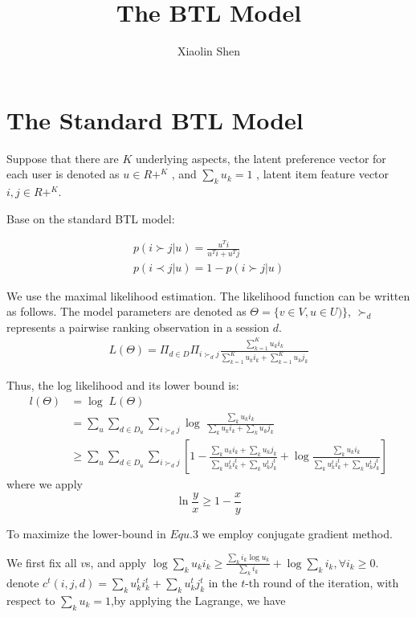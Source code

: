 \documentclass{article}
\title{The BTL Model}
\author{Xiaolin Shen}
\begin{document}
\maketitle


\section{The Standard BTL Model}

Suppose that there are $K$ underlying aspects, the latent preference vector for each user is denoted as $ u \in  R+ ^K$ , and $\sum_k u_k = 1$ , latent item feature vector $ i, j \in R + ^K$.

Base on the standard BTL model:

\begin{align*}
	p(i \succ j |u)=\frac{u^{T}i}{u^{T}i+ u^{T}j} \\
	p(i \prec j |u)=1-p(i \succ j |u)
\end{align*}

We use the maximal likelihood estimation. The likelihood function can be written as follows. The model parameters are denoted as $ \Theta = \{ v \in V ,u \in U ) \}$, $\succ_d $ represents a pairwise ranking observation in a session $d$.
\begin{align}
L(\Theta)
= \Pi_{d \in D} \Pi_{i \succ_d j}\frac{\sum_{k=1}^{K} u_k i_k}{\sum_{k=1}^{K} u_k i_k+ \sum_{k=1}^{K} u_k j_k}
\end{align}

Thus, the log likelihood and its lower bound is:
\begin{align}
l(\Theta) &= \log \; L(\Theta) \\
& =\sum_{u} \sum_{d\in D_u} \sum_{i \succ_d j} \log \;  \frac{\sum_k u_k i_k}{\sum_k u_k i_k+ \sum_k u_k j_k}\\ \nonumber
& \geq \sum_{u} \sum_{d\in D_u} \sum_{i \succ_d j}[1- \frac{\sum_k u_k i_k+ \sum_k u_k j_k}{\sum_k u_k^t i_k^t+ \sum_k u_k^t j_k^t}+ \log \frac{\sum_k u_k i_k}{\sum_k u_k^t i_k^t+ \sum_k u_k^t j_k^t}]
\end{align}
where we apply 
\begin{equation*}
\ln \frac{y}{x} \geq 1- \frac{x}{y}
\end{equation*}

To maximize the lower-bound in $Equ.3$ we employ conjugate gradient method. 

We first fix all $v$s, and apply  $ \log \sum_k u_k i_k \geq \frac{\sum_k i_k \log u_k}{\sum_k i_k} + \log \sum_k i_k,\forall i_k \geq 0.$  denote $ c^t(i, j, d)=\sum_k u_k^t i_k^t+ \sum_k u_k^t j_k^t  $ in the $t$-th round of the iteration, with respect to $\sum_k u_k=1$,by applying the Lagrange, we have
\end{document}
